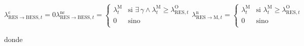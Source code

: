 \begin{subequations}
  \begin{equation}
    \lambda^{\mathrm{c}}_{\mathrm{RES} \rightarrow \mathrm{BESS}, t} = 0
  \end{equation}

  \begin{equation}
    \lambda^{\mathrm{nc}}_{\mathrm{RES} \rightarrow \mathrm{BESS}, t} =
    \begin{cases}
      \lambda^{\mathrm{M}}_{t} & \text{si } \exists \, \gamma \land \lambda^{\mathrm{M}}_{t} \ge \lambda^{\mathrm{O}}_{\mathrm{RES}, t} \\
      0                        & \text{sino}                                                                                            \\
    \end{cases}
  \end{equation}

  \begin{equation}
    \lambda^{\mathrm{n}}_{\mathrm{RES} \rightarrow \mathrm{M}, t} =
    \begin{cases}
      \lambda^{\mathrm{M}}_{t} & \text{si } \lambda^{\mathrm{M}}_{t} \ge \lambda^{\mathrm{O}}_{\mathrm{RES}, t} \\
      0                        & \text{sino}                                                                    \\
    \end{cases}
  \end{equation}

\end{subequations}

donde

